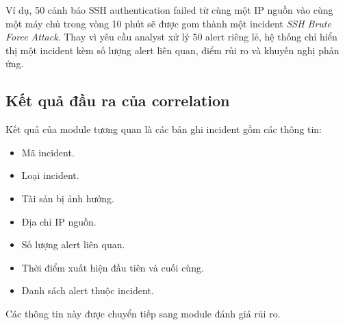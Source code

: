 \documentclass[a4paper,12pt,oneside]{book}
\begin{document}
{{\noindent Ví dụ, 50 cảnh báo SSH authentication failed từ cùng một IP nguồn vào cùng một máy chủ trong vòng 10 phút sẽ được gom thành một incident \textit{SSH Brute Force Attack}. Thay vì yêu cầu analyst xử lý 50 alert riêng lẻ, hệ thống chỉ hiển thị một incident kèm số lượng alert liên quan, điểm rủi ro và khuyến nghị phản ứng.

}

\subsection{Kết quả đầu ra của correlation}
{\fontsize{13pt}{15.6pt}\selectfont

Kết quả của module tương quan là các bản ghi incident gồm các thông tin:

\begin{itemize}
    \item Mã incident.
    \item Loại incident.
    \item Tài sản bị ảnh hưởng.
    \item Địa chỉ IP nguồn.
    \item Số lượng alert liên quan.
    \item Thời điểm xuất hiện đầu tiên và cuối cùng.
    \item Danh sách alert thuộc incident.
\end{itemize}

\noindent Các thông tin này được chuyển tiếp sang module đánh giá rủi ro.

}

}
\end{document}
